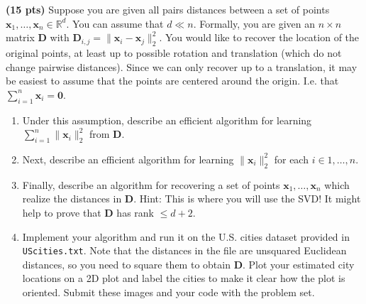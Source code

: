 \documentclass[10pt]{article}
\newcommand{\bv}[1]{\mathbf{#1}}
\newcommand{\R}{\mathbb{R}}
\begin{document}
	\textbf{(15 pts)} Suppose you are given all pairs distances between a set of points $\bv{x}_1, \ldots, \bv{x}_n \in \R^d$. You can assume that $d \ll n$. Formally, you are given an $n\times n$ matrix $\bv{D}$ with $\bv{D}_{i,j} = \|\bv{x}_i - \bv{x}_j\|_2^2$. You would like to recover the location of the original points, at least up to possible rotation and translation (which do not change pairwise distances). Since we can only recover up to a translation, it may be easiest to assume that the points are centered around the origin. I.e. that $\sum_{i=1}^n \bv{x}_i = \bv{0}$. 
	\begin{enumerate}[label=(\alph*)]
		\item Under this assumption, describe an efficient algorithm for learning $\sum_{i=1}^n \|\bv{x}_i\|_2^2$ from $\bv{D}$. 
		\item Next, describe an efficient algorithm for learning $\|\bv{x}_i\|_2^2$ for each $i \in 1, \ldots, n$. 
		\item Finally, describe an algorithm for recovering a set of points $\bv{x}_1,\ldots, \bv{x}_n$ which realize the distances in $\bv{D}$. Hint: This is where you will use the SVD! It might help to prove that $\bv{D}$ has rank $\leq d + 2$.
		\item
		Implement your algorithm and run it on the U.S. cities dataset provided in \texttt{UScities.txt}. Note that the distances in the file are unsquared Euclidean distances, so you need to square them to obtain $\bv{D}$. Plot your  estimated city locations on a 2D plot and label the cities to make it clear how the plot is oriented. Submit these images and your code with the problem set.
	\end{enumerate}
\end{document}

